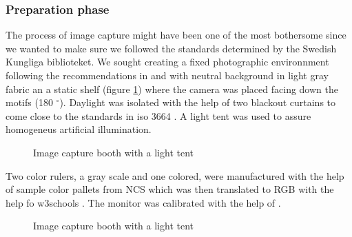 \documentclass[12 pt]{paper}
\begin{document}
\subsubsection{Preparation phase}
The process of image capture might have been one of the most bothersome since we wanted to make sure we followed the standards determined by the Swedish Kungliga biblioteket. We sought creating a fixed photographic environnment following the recommendations in \textcite[]{dgf1216} and \textcite[part 3]{kronlund2021p3} with neutral background in light gray fabric an a static shelf (figure \ref{baset}) where the camera was placed facing down the motifs (180 $ ^{\circ} $).  Daylight was isolated with the help of two blackout curtains to come close to the standards in iso 3664 \autocite[cf.][]{johansson2021}. A light tent was used to assure homogeneus artificial illumination.  %



\begin{figure}[!htb]
	\centering
	\caption[short:]{Image capture booth with a light tent}
	\label{baset}
\end{figure}

Two color rulers, a gray scale and one colored,  were manufactured with the help of sample color pallets from NCS which was then translated to RGB with the help fo w3schools \autocite[]{w3}. The monitor was calibrated with the help of \textcite[]{koch2007}. 


\begin{figure}[!htb]
	\centering
	\caption[short:]{Image capture booth with a light tent}
	\label{ruler}
\end{figure}
\end{document}
